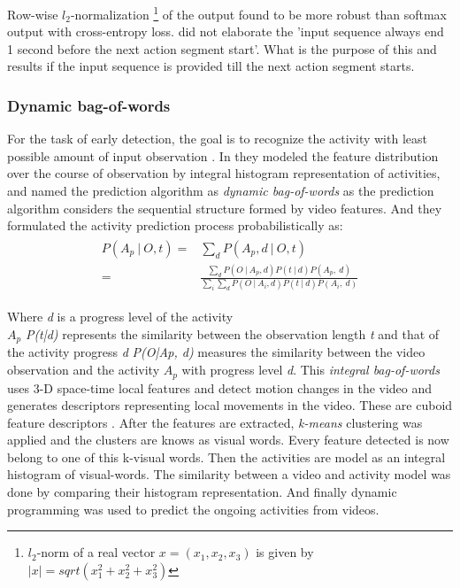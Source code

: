 \newpara Row-wise $\textit{l}_2$-normalization \footnote{$l_2$-norm of a real vector $x=(x_1,x_2,x_3)$ is given by $|x|=sqrt(x_1^2+x_2^2+x_3^2)$} of the output found to be more robust than softmax output with cross-entropy loss. \cite{abu2018will} did not elaborate the 'input sequence always end 1 second before the next action segment start'. What is the purpose of this and results if the input sequence is provided till the next action segment starts.

\subsubsection{Dynamic bag-of-words} 
For the task of early detection, the goal is to recognize the activity with least possible amount of input observation \cite{ryoo2011human}. In \cite{ryoo2011human} they modeled the feature distribution over the course of observation by integral histogram representation of activities, and named the prediction algorithm as \textit{dynamic bag-of-words} as the prediction algorithm considers the sequential structure formed by video features. And they formulated the activity prediction process probabilistically as:
\begin{align}
\begin{split}
		P(A_{p}\: |\: O,t) ={}& \displaystyle \sum_{d}  P(A_{p},d\: |\: O,t)\\
		={}&	\frac{\sum_{d} P(O\: | \: A_{p},d)P(t\: | \:d)P(A_{p},\: d)}
	 {\sum_{i}\sum_{d} P(O\: | \: A_{i},d)P(t\: | \:d)P(A_{i},\: d) }
\end{split}
\end{align}

\newpara Where \textit{d} is a progress level of the activity \\
\textit{$A_{p}$}  \textit{ P(t|d)} represents the similarity between the observation length \textit{t} and that of the activity progress \textit{d}
\textit{P(O|Ap, d)} measures the similarity between the video observation and the activity \textit{$A_{p}$} with progress level \textit{d}. This \textit{integral bag-of-words} uses 3-D space-time local features and detect motion changes in the video and generates descriptors representing local movements in the video. These are cuboid feature descriptors \cite{dollar2005behavior}. After the features are extracted, \textit{k-means} clustering was applied and the clusters are knows as visual words. Every feature detected is now belong to one of this k-visual words. Then the activities are model as an integral histogram of visual-words. The similarity between a video and activity model was done by comparing their histogram representation. And finally dynamic programming was used to predict the ongoing activities from videos.

